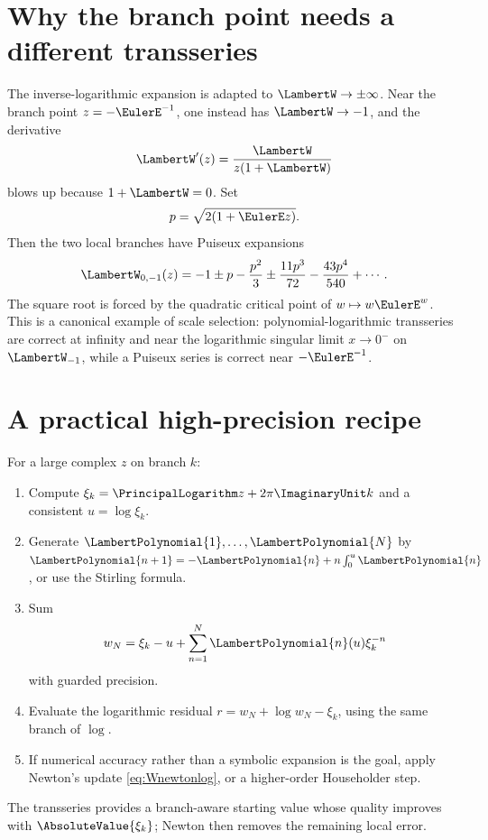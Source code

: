 \documentclass[11pt,oneside,openany]{book}
\begin{document}
\section{Why the branch point needs a different transseries}
The inverse-logarithmic expansion is adapted to \(\LambertW\to\pm\infty\).  Near the
branch point \(z=-\EulerE^{-1}\), one instead has \(\LambertW\to-1\), and the derivative
\[
 \LambertW'(z)=\frac{\LambertW}{z(1+\LambertW)}
\]
blows up because \(1+\LambertW=0\).  Set
\begin{equation}\label{eq:branchp}
 p=\sqrt{2(1+\EulerE z)}.
\end{equation}
Then the two local branches have Puiseux expansions
\begin{equation}\label{eq:branchpointW}
 \LambertW_{0,-1}(z)
 =-1\pm p-\frac{p^2}{3}
   \pm\frac{11p^3}{72}-\frac{43p^4}{540}+\cdots.
\end{equation}
The square root is forced by the quadratic critical point of
\(w\mapsto w\EulerE^w\).  This is a canonical example of scale selection:
polynomial-logarithmic transseries are correct at infinity and near the
logarithmic singular limit \(x\to0^-\) on \(\LambertW_{-1}\), while a Puiseux series is
correct near \(-\EulerE^{-1}\).

\section{A practical high-precision recipe}
For a large complex \(z\) on branch \(k\):
\begin{enumerate}
\item Compute \(\xi_k=\PrincipalLogarithm z+2\pi\ImaginaryUnit k\) and a consistent
\(u=\log\xi_k\).
\item Generate \(\LambertPolynomial{1},\ldots,\LambertPolynomial{N}\) by
\(\LambertPolynomial{n+1}=-\LambertPolynomial{n}+n\int_0^u\LambertPolynomial{n}\), or use the Stirling formula.
\item Sum
\[
 w_N=\xi_k-u+\sum_{n=1}^{N}\LambertPolynomial{n}(u)\xi_k^{-n}
\]
with guarded precision.
\item Evaluate the logarithmic residual
\(r=w_N+\log w_N-\xi_k\), using the same branch of \(\log\).
\item If numerical accuracy rather than a symbolic expansion is the goal,
apply Newton's update \cref{eq:Wnewtonlog}, or a higher-order Householder step.
\end{enumerate}
The transseries provides a branch-aware starting value whose quality improves
with \(\AbsoluteValue{\xi_k}\); Newton then removes the remaining local error.
\end{document}
